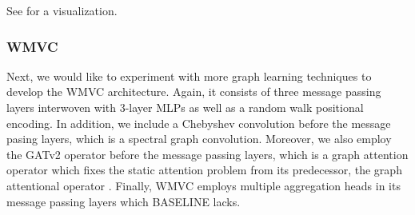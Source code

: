\documentclass{article}
\begin{document}
See  for a visualization.

\subsubsection{WMVC}
Next, we would like to experiment with more graph learning techniques
to develop the WMVC architecture.
Again,
it consists of three message passing layers
interwoven with 3-layer MLPs
as well as a random walk positional encoding.
In addition,
we include a Chebyshev convolution \citet{defferrard2016conv} before the message pasing layers,
which is a spectral graph convolution.
Moreover,
we also employ the GATv2 operator \citet{brody2021attentive} before the message passing layers,
which is a graph attention operator which fixes the static attention problem from its predecessor,
the graph attentional operator \citet{velivckovic2017graph}.
Finally,
WMVC employs multiple aggregation heads \citet{corso2020principal, tailor2021we} in its message passing layers which BASELINE lacks.
\end{document}
